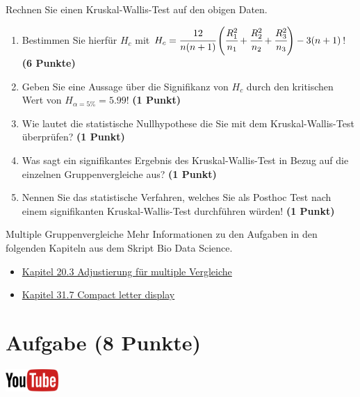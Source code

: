 \documentclass[a4paper, 10pt]{scrartcl}\usepackage[]{graphicx}\usepackage[]{xcolor}
\begin{document}
Rechnen Sie einen Kruskal-Wallis-Test auf den obigen Daten.

\begin{enumerate}
\item Bestimmen Sie hierf{\"u}r $H_c$ mit $H_c =
  \cfrac{12}{n(n+1)}\left(\cfrac{R_1^2}{n_1}+\cfrac{R_2^2}{n_2}
    + \cfrac{R_3^2}{n_3}\right)
  - 3(n+1)$! \textbf{(6 Punkte)} 
\item Geben Sie eine Aussage {\"u}ber die Signifikanz von $H_c$ durch
  den kritischen Wert von $H_{\alpha = 5\%} = 5.99$! \textbf{(1 Punkt)}
\item Wie lautet die statistische Nullhypothese die Sie mit dem Kruskal-Wallis-Test
  {\"u}berpr{\"u}fen? \textbf{(1 Punkt)}
\item Was sagt ein signifikantes Ergebnis des Kruskal-Wallis-Test in Bezug
  auf die einzelnen Gruppenvergleiche aus? \textbf{(1 Punkt)}
\item Nennen Sie das statistische Verfahren, welches Sie als Posthoc Test
  nach einem signifikanten Kruskal-Wallis-Test durchf{\"u}hren w{\"u}rden! \textbf{(1 Punkt)}
\end{enumerate} 
\clearpage
\begin{graybox}{Multiple Gruppenvergleiche}
Mehr Informationen zu den Aufgaben in den folgenden Kapiteln aus dem Skript Bio Data Science.
  \begin{itemize}
  \item \href{https://jkruppa.github.io/stat-tests-theorie.html#sec-statistisches-testen-alpha-adjust}{Kapitel 20.3 Adjustierung für multiple Vergleiche}
  \item \href{https://jkruppa.github.io/stat-tests-posthoc.html#sec-compact-letter}{Kapitel 31.7 Compact letter display}
  \end{itemize}
\end{graybox}
\clearpage

\section{Aufgabe \hfill (8 Punkte)}


 \hfill\href{https://youtu.be/hr_jPd1hpKY}{\includegraphics[width =
   2cm]{img/youtube}}\\[1Ex]
\end{document}
